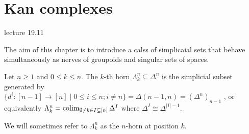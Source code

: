 \section{Kan complexes}

lecture 19.11

The aim of this chapter is to introduce a calss of simplicaial sets that behave simultaneously as nerves of groupoids and singular sets of spaces.

\begin{defi}
    Let $n \geq 1$ and $ 0 \leq k \leq n$.
    The $k$-th horn $\Lambda_k^n \subseteq \Delta^n$ is the simplicial subset generated by $\{ d^i \colon [n-1] \to [n] \mid 0 \leq i \leq n ; i \neq n \} = \Delta ( n-1,n) = (\Delta^n)_{n-1}$ , or equivalently $\Lambda_k^n = \operatorname{colim}_{\emptyset \neq k \in I \subsetneq [n]}\Delta^I$ where $\Delta^I \cong \Delta^{\lvert I \rvert -1}$.
\end{defi}

\begin{rmk}
    We will sometimes refer to $\Lambda_k^n$ as the $n$-horn at position $k$.     
\end{rmk}

